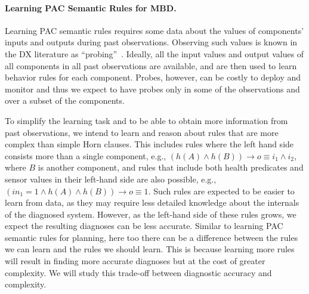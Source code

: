 \documentclass[12pt]{article}
\begin{document}

\paragraph{Learning PAC Semantic Rules for MBD.}
Learning PAC semantic rules requires some data about the values of components' inputs and outputs 
during past observations. Observing such values is known in the DX literature as ``probing''~\cite{deKleer1987diagnosing,rish2004real,feldman2010model}. 
Ideally, all the input values and output values of all components in all past observations are available, 
and are then used to learn behavior rules for each component. 
Probes, however, can be costly to deploy and monitor and thus we expect to have probes only in some of the observations and over a subset of the components. 

To simplify the learning task and to be able to obtain more information from past observations, we intend to learn and reason about rules that are more complex than simple Horn clauses. This includes rules where the left hand side consists more than a single component,  e.g., $(h(A)\wedge h(B)) \rightarrow o\equiv i_1\wedge i_2$, where $B$ is another component, 
and rules that include both health predicates and sensor values in their left-hand side are also possible, e.g., 
$(in_1=1 \wedge h(A) \wedge h(B))\rightarrow o\equiv 1$. Such rules are expected to be easier to learn from data, as they may require less detailed knowledge about the internals of the diagnosed system. 
However, as the left-hand side of these rules grows, we expect the resulting diagnoses can be less accurate. 
Similar to learning PAC semantic rules for planning, here too there can be a difference between the rules we can learn and the rules we should learn. This is because learning more rules will result in finding more accurate diagnoses but at the cost of greater complexity. We will study this trade-off between diagnostic accuracy and complexity. 
\end{document}
